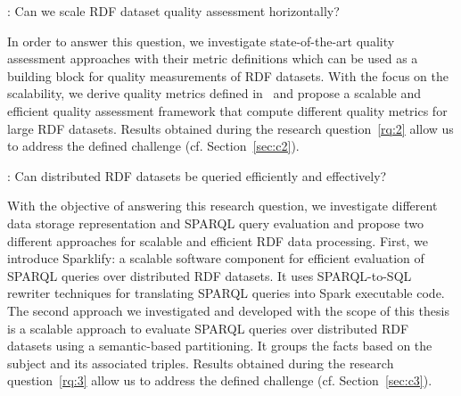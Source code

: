 \begin{tcolorbox}
\textbf{\rqNr[RQ2]\label{rq:2}}: Can we scale \gls{RDF} dataset quality assessment horizontally?
\end{tcolorbox}

In order to answer this question, we investigate state-of-the-art quality assessment approaches with their metric definitions which can be used as a building block for quality measurements of \gls{RDF} datasets.
With the focus on the scalability, we derive quality metrics defined in~\cite{zaveri2015quality} and propose a scalable and efficient quality assessment framework that compute different quality metrics for large \gls{RDF} datasets.
Results obtained during the research question~\ref{rq:2} allow us to address the defined challenge (cf. Section~\ref{sec:c2}).

\begin{tcolorbox}
\textbf{\rqNr[RQ3]\label{rq:3}}: Can distributed \gls{RDF} datasets be queried efficiently and effectively?
\end{tcolorbox}

With the objective of answering this research question, we investigate different data storage representation and \gls{SPARQL} query evaluation and propose two different approaches for scalable and efficient \gls{RDF} data processing.
First, we introduce Sparklify: a scalable software component for efficient evaluation of \gls{SPARQL} queries over distributed \gls{RDF} datasets.
It uses SPARQL-to-SQL rewriter techniques for translating \gls{SPARQL} queries into Spark executable code.
The second approach we investigated and developed with the scope of this thesis is a scalable approach to evaluate \gls{SPARQL} queries over distributed \gls{RDF} datasets using a semantic-based partitioning.
It groups the facts based on the subject and its associated triples.
Results obtained during the research question~\ref{rq:3} allow us to address the defined challenge (cf. Section~\ref{sec:c3}). 



